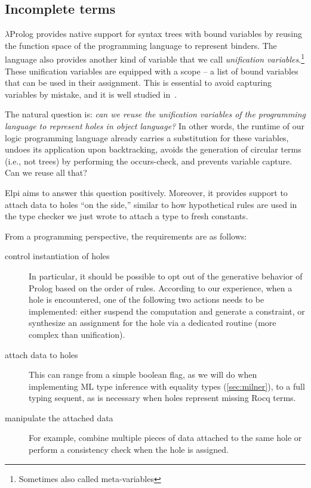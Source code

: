 \documentclass[a4paper, 11pt]{book}
\begin{document}
\subsection{Incomplete terms}


$\lambda$Prolog provides native support for syntax trees with bound variables
by reusing the function space of the programming language to represent
binders. 
The language also provides another kind of variable that we call \emph{unification
variables}.\footnote{Sometimes also called meta-variables} These unification
variables are equipped with a scope -- a list of bound variables that can be
used in their assignment. This is essential to avoid capturing variables by
mistake, and it is well studied in~\cite{miller92jsc}.

The natural question is: \emph{can we reuse the unification variables of the
programming language to represent holes in object language?}
In other words, the runtime of our logic programming language already carries
a substitution for these variables, undoes its application upon
backtracking, avoids the generation of circular terms (i.e., not trees) by
performing the occurs-check, and prevents variable capture. Can we reuse all
that?

Elpi aims to answer this question positively. Moreover, it provides support
to attach data to holes ``on the side,'' similar to how hypothetical rules are
used in the type checker we just wrote to attach a type to fresh constants.

From a programming perspective, the requirements are as follows:

\begin{description}
  \item[control instantiation of holes] In particular, it should be possible
    to opt out of the generative behavior of Prolog based on the order of
    rules. According to our experience, when a hole is encountered, one of
    the following two actions needs to be implemented: either suspend the
    computation and generate a constraint, or synthesize an assignment for
    the hole via a dedicated routine (more complex than unification).
  \item[attach data to holes] This can range from a simple boolean flag, as
    we will do when implementing ML type inference with equality types
    (\cref{sec:milner}), to a full typing sequent, as is necessary when holes
    represent missing Rocq terms.

  \item[manipulate the attached data] For example, combine multiple pieces of
    data attached to the same hole or perform a consistency check when the
    hole is assigned.
\end{description}
\end{document}
